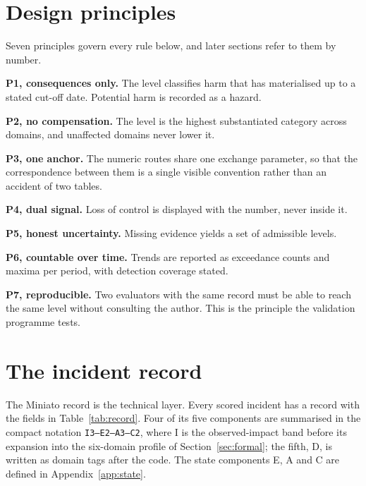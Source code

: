 \documentclass[11pt,a4paper]{article}
\begin{document}
\section{Design principles}
\label{sec:principles}

Seven principles govern every rule below, and later sections refer to them by number.

\textbf{P1, consequences only.} The level classifies harm that has materialised up to a stated cut-off date. Potential harm is recorded as a hazard.

\textbf{P2, no compensation.} The level is the highest substantiated category across domains, and unaffected domains never lower it.

\textbf{P3, one anchor.} The numeric routes share one exchange parameter, so that the correspondence between them is a single visible convention rather than an accident of two tables.

\textbf{P4, dual signal.} Loss of control is displayed with the number, never inside it.

\textbf{P5, honest uncertainty.} Missing evidence yields a set of admissible levels.

\textbf{P6, countable over time.} Trends are reported as exceedance counts and maxima per period, with detection coverage stated.

\textbf{P7, reproducible.} Two evaluators with the same record must be able to reach the same level without consulting the author. This is the principle the validation programme tests.

\section{The incident record}
\label{sec:record}

The Miniato record is the technical layer. Every scored incident has a record with the fields in Table~\ref{tab:record}. Four of its five components are summarised in the compact notation \texttt{I3--E2--A3--C2}, where I is the observed-impact band before its expansion into the six-domain profile of Section~\ref{sec:formal}; the fifth, D, is written as domain tags after the code. The state components E, A and C are defined in Appendix~\ref{app:state}.
\end{document}
